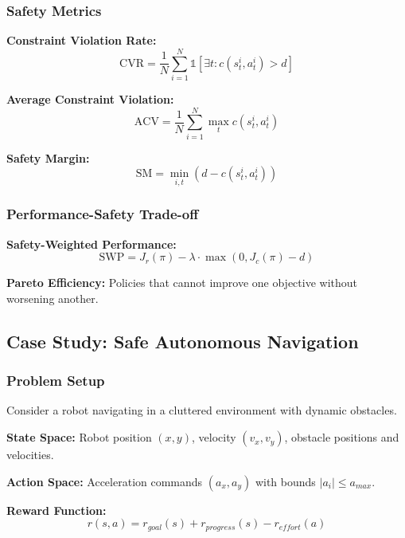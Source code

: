 \documentclass[12pt]{article}
\begin{document}
{{{{\subsubsection{Safety Metrics}

\textbf{Constraint Violation Rate:}
\begin{equation}
\text{CVR} = \frac{1}{N} \sum_{i=1}^{N} \mathbb{1}[\exists t: c(s_t^i, a_t^i) > d]
\end{equation}

\textbf{Average Constraint Violation:}
\begin{equation}
\text{ACV} = \frac{1}{N} \sum_{i=1}^{N} \max_t c(s_t^i, a_t^i)
\end{equation}

\textbf{Safety Margin:}
\begin{equation}
\text{SM} = \min_{i,t} (d - c(s_t^i, a_t^i))
\end{equation}

\subsubsection{Performance-Safety Trade-off}

\textbf{Safety-Weighted Performance:}
\begin{equation}
\text{SWP} = J_r(\pi) - \lambda \cdot \max(0, J_c(\pi) - d)
\end{equation}

\textbf{Pareto Efficiency:} Policies that cannot improve one objective without worsening another.

\subsection{Case Study: Safe Autonomous Navigation}

\subsubsection{Problem Setup}

Consider a robot navigating in a cluttered environment with dynamic obstacles.

\textbf{State Space:} Robot position $(x, y)$, velocity $(v_x, v_y)$, obstacle positions and velocities.

\textbf{Action Space:} Acceleration commands $(a_x, a_y)$ with bounds $|a_i| \leq a_{max}$.

\textbf{Reward Function:}
\begin{equation}
r(s,a) = r_{goal}(s) + r_{progress}(s) - r_{effort}(a)
\end{equation}

}}}}
\end{document}
